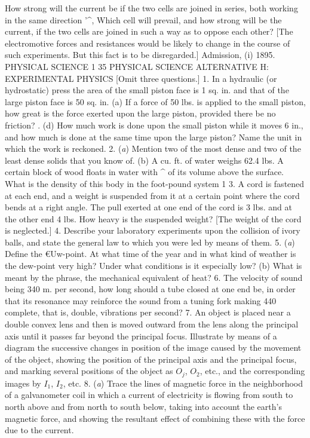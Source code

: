 How strong will the current be if the two cells are joined in series, both working in the same direction '^,
Which cell will prevail, and how strong will be the current, if the two cells are joined in such a way as to oppose each other? [The electromotive forces and resistances would be likely to change in the course of such experiments. But this fact is to be disregarded.]
Admission, (i) 1895.
PHYSICAL SCIENCE 1 35
PHYSICAL SCIENCE ALTERNATIVE H: EXPERIMENTAL PHYSICS
[Omit three questions.]
1. In a hydraulic (or hydrostatic) press the area of the small piston face is 1 sq. in. and that of the large piston face is 50 sq. in.
(a) If a force of 50 lbs. is applied to the small piston, how great is the force exerted upon the large piston, provided there be no friction? .
(d) How much work is done upon the small piston while it moves 6 in., and how much is done at the same time upon the large piston? Name the unit in which the work is reckoned.
2. (\emph{a}) Mention two of the most dense and two of the least dense solids that you know of.
(b) A cu. ft. of water weighs 62.4 lbs. A certain block of wood floats in water with ^ of its volume above the surface. What is the density of this body in the foot-pound system 1
3. A cord is fastened at each end, and a weight is suspended from it at a certain point where the cord bends at a right angle. The pull exerted at one end of the cord is 3 lbs. and at the other end 4 lbs. How heavy is the suspended weight? [The weight of the cord is neglected.]
4. Describe your laboratory experiments upon the collision of ivory balls, and state the general law to which you were led by means of them.
5. (\emph{a}) Define the €Uw-point. At what time of the year and in what kind of weather is the dew-point very high? Under what conditions is it especially low?
(b) What is meant by the phrase, the mechanical equivalent of heat?
6. The velocity of sound being 340 m. per second, how long should a tube closed at one end be, in order that its resonance
may reinforce the sound from a tuning fork making 440 complete, that is, double, vibrations per second?
7. An object is placed near a double convex lens and then is moved outward from the lens along the principal axis until it passes far beyond the principal focus. Illustrate by means of a diagram the successive changes in position of the image caused by the movement of the object, showing the position of the principal axis and the principal focus, and marking several positions of the object as $O_j$, $O_2$, etc., and the corresponding images by $I_1$, $I_2$, etc.
8. (\emph{a}) Trace the lines of magnetic force in the neighborhood of a galvanometer coil in which a current of electricity is flowing from south to north above and from north to south below, taking into account the earth's magnetic force, and showing the resultant effect of combining these with the force due to the current.
